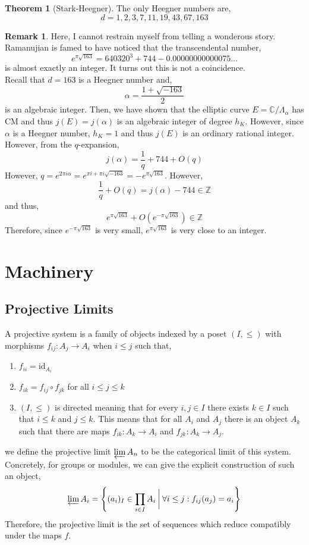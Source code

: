 \documentclass{article}
\newcommand{\Z}{\mathbb{Z}}
\newcommand{\C}{\mathbb{C}}
\newcommand{\id}{\mathrm{id}}
\theoremstyle{definition}
\newtheorem{theorem}{Theorem}[section]
\newtheorem{remark}{Remark}[section]
\newenvironment{definition}[1][Definition:]{\begin{trivlist}
\item[\hskip \labelsep {\bfseries #1}]}{\end{trivlist}}
\begin{document}
\begin{theorem}[Stark-Heegner]
The only Heegner numbers are,
\[ d = 1, 2, 3, 7, 11, 19, 43, 67, 163 \]
\end{theorem}

\begin{remark}
Here, I cannot restrain myself from telling a wonderous story. Ramanujian is famed to have noticed that the transcendental number,
\[ e^{\pi \sqrt{163}} = 640320^3 + 744 - 0.00000000000075\dots \]
is almost exactly an integer. It turns out this is not a coincidence. 
\bigskip\\
Recall that $d = 163$ is a Heegner number and,
\[ \alpha = \frac{1 + \sqrt{-163}}{2} \]
is an algebraic integer. Then, we have shown that the elliptic curve $E = \C / \Lambda_{\alpha}$ has CM and thus $j(E) = j(\alpha)$ is an algebraic integer of degree $h_K$. However, since $\alpha$ is a Heegner number, $h_K = 1$ and thus $j(E)$ is an ordinary rational integer. However, from the $q$-expansion,
\[ j(\alpha) = \frac{1}{q} + 744 + O(q) \]
However, $q = e^{2 \pi i \alpha} = e^{\pi i + \pi i \sqrt{-163}} = - e^{\pi \sqrt{163}}$. However,
\[ \frac{1}{q} + O(q) = j(\alpha) - 744 \in \Z \] 
and thus,
\[ e^{\pi \sqrt{163}} + O(e^{- \pi \sqrt{163}}) \in \Z \]
Therefore, since $e^{- \pi \sqrt{163}}$ is very small, $e^{\pi \sqrt{163}}$ is very close to an integer.
\end{remark}

\section{Machinery}

\subsection{Projective Limits}

\begin{definition}
A projective system is a family of objects indexed by a poset $(I, \le)$ with morphisms $f_{ij} : A_j \to A_i$ when $i \le j$ such that,
\begin{enumerate}
\item $f_{ii} = \id_{A_i}$
\item $f_{ik} = f_{ij} \circ f_{jk}$ for all $i \le j \le k$
\item $(I, \le)$ is directed meaning that for every $i, j \in I$ there exists $k \in I$ such that $i \le k$ and $j \le k$. This means that for all $A_i$ and $A_j$ there is an object $A_k$ such that there are maps $f_{ik} : A_k \to A_i$ and $f_{jk} : A_k \to A_j$.
\end{enumerate}
we define the projective limit $\varprojlim A_n$ to be the categorical limit of this system. Concretely, for groups or modules, we can give the explicit construction of such an object,
\[ \varprojlim A_i = \left\{ (a_i)_{I} \in \prod_{i \in I} A_i \: \bigg| \: \forall i \le j : f_{ij}(a_j) = a_{i}  \right\} \]
Therefore, the projective limit is the set of sequences which reduce compatibly under the maps $f$.  
\end{definition}
\end{document}
